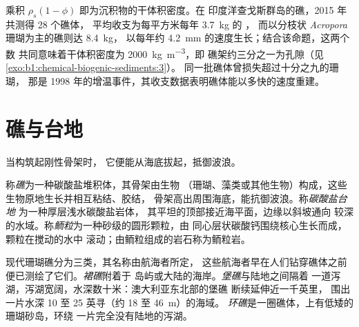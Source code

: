 乘积 $\rho_s(1-\phi)$ 即为沉积物的干体积密度。在
印度洋查戈斯群岛的礁，2015 年共测得 28 个礁体，
平均收支为每平方米每年 \qty{3.7}{kg} 的 ，
而以分枝状 \emph{Acropora} 珊瑚为主的礁则达 \qty{8.4}{kg}，
以每年约 \qty{4.2}{mm} 的速度生长；结合该命题，这两个数
共同意味着干体积密度为 \qty{2000}{kg.m^{-3}}，即
礁架约三分之一为孔隙（见\cref{exo:b1:chemical-biogenic-sediments:3}）。
同一批礁体曾损失超过十分之九的珊瑚，
那是 1998 年的增温事件，其收支数据表明礁体能以多快的速度重建。

\section{礁与台地}\label{sec:b1:chemical-biogenic-sediments:reefs}

当构筑起刚性骨架时，
它便能从海底拔起，抵御波浪。

\begin{definition}[礁、碳酸盐台地、鲕粒]\label{def:b1:chemical-biogenic-sediments:reef}
称\emph{礁}为一种碳酸盐堆积体，其骨架由生物
（珊瑚、藻类或其他生物）构成，这些生物原地生长并相互粘结、胶结，
骨架高出周围海底，能抗御波浪。称\emph{碳酸盐台地}
为一种厚层浅水碳酸盐岩体，
其平坦的顶部接近海平面，边缘以斜坡通向
较深的水域。称\emph{鲕粒}为一种砂级的圆形颗粒，由
同心层状碳酸钙围绕核心生长而成，颗粒在搅动的水中
滚动；由鲕粒组成的岩石称为鲕粒岩。
\end{definition}

现代珊瑚礁分为三类，其名称由航海者所定，
这些航海者早在人们钻穿礁体之前便已测绘了它们。\emph{裙礁}附着于
岛屿或大陆的海岸。\emph{堡礁}与陆地之间隔着
一道泻湖，泻湖宽阔，水深数十米：澳大利亚东北部的堡礁
断续延伸近一千英里，
围出一片水深 10 至 25 英寻（约 18 至 \qty{46}{m}）的海域。
\emph{环礁}是一圈礁体，上有低矮的珊瑚砂岛，环绕
一片完全没有陆地的泻湖。

